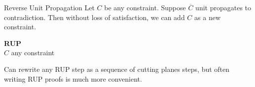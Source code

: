 \documentclass[aspectratio=169,compress,10pt]{beamer}
\begin{document}
\begin{frame}{Reverse Unit Propagation}
    Let $C$ be any constraint. Suppose $\overline{C}$ unit propagates to contradiction. Then without
    loss of satisfaction, we can add $C$ as a new constraint.

    \bigskip

    \begin{minipage}[c]{0.35\framewidth}
        \textcolor{uofgcobalt}{\textbf{RUP}}\\
        $C$ any constraint
    \end{minipage}\hfill\begin{minipage}[c]{0.60\framewidth}\begin{prooftree}
    \end{prooftree}\end{minipage}

    \bigskip

    Can rewrite any RUP step as a sequence of cutting planes steps, but often writing RUP proofs is
    much more convenient.
\end{frame}
\end{document}

